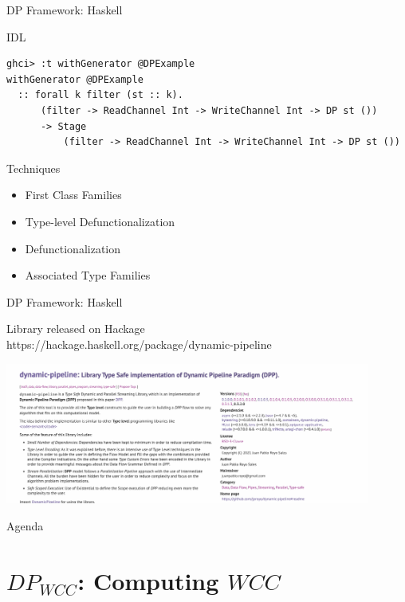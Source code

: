 \documentclass{beamer}
\begin{document}
  \begin{frame}[fragile]{DP Framework: Haskell}
    \begin{block}{IDL}
      \begin{verbatim}      
ghci> :t withGenerator @DPExample
withGenerator @DPExample
  :: forall k filter (st :: k).
      (filter -> ReadChannel Int -> WriteChannel Int -> DP st ())
      -> Stage
          (filter -> ReadChannel Int -> WriteChannel Int -> DP st ())    
    \end{verbatim}
  \end{block}
  \begin{block}{Techniques}
    \begin{itemize}
      \item First Class Families
      \item Type-level Defunctionalization 
      \item Defunctionalization
      \item Associated Type Families
    \end{itemize}
  \end{block}
  \end{frame}

  \begin{frame}[fragile]{DP Framework: Haskell}
    \begin{block}{}
      Library released on Hackage \\
      https://hackage.haskell.org/package/dynamic-pipeline
      \begin{center}
        \includegraphics[width = 0.9\textwidth, height = 0.6\textheight]{dp-fw-hs}
      \end{center}  
    \end{block}
  \end{frame}

  \begin{frame}{Agenda}
    \section{$DP_{WCC}$: Computing $WCC$}
    \tableofcontents[currentsection]
  \end{frame}
\end{document}
